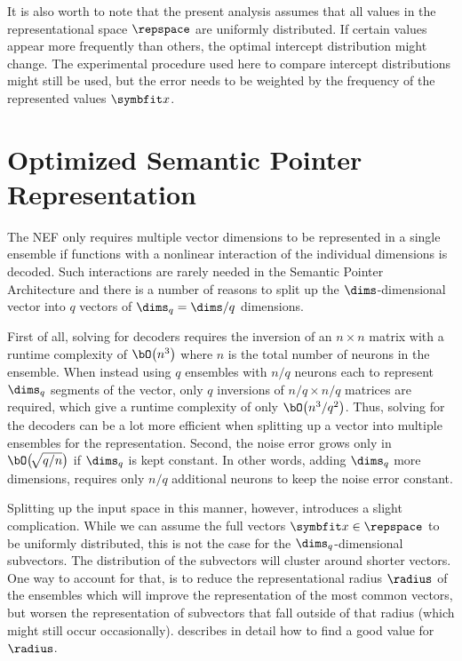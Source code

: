 It is also worth to note that the present analysis assumes that all values in the representational space $\repspace$ are uniformly distributed.
If certain values appear more frequently than others, the optimal intercept distribution might change.
The experimental procedure used here to compare intercept distributions might still be used, but the error needs to be weighted by the frequency of the represented values $\vc x$.


\section{Optimized Semantic Pointer Representation}
The NEF only requires multiple vector dimensions to be represented in a single ensemble if functions with a nonlinear interaction of the individual dimensions is decoded.
Such interactions are rarely needed in the Semantic Pointer Architecture and there is a number of reasons to split up the $\dims$-dimensional vector into $q$ vectors of $\dims_q = \dims / q$ dimensions.

First of all, solving for decoders requires the inversion of an $n \times n$ matrix with a runtime complexity of $\bO\bigl(n^3\bigr)$ where $n$ is the total number of neurons in the ensemble.
When instead using $q$ ensembles with $n/q$ neurons each to represent $\dims_q$ segments of the vector, only $q$ inversions of $n/q \times n/q$ matrices are required, which give a runtime complexity of only $\bO\bigl(n^3/q^2\bigr)$.
Thus, solving for the decoders can be a lot more efficient when splitting up a vector into multiple ensembles for the representation.
Second, the noise error grows only in $\bO\bigl(\!\sqrt{q/n}\bigr)$ if $\dims_q$ is kept constant.
In other words, adding $\dims_q$ more dimensions, requires only $n/q$ additional neurons to keep the noise error constant.

Splitting up the input space in this manner, however, introduces a slight complication.
While we can assume the full vectors $\vc x \in \repspace$ to be uniformly distributed, this is not the case for the $\dims_q$-dimensional subvectors.
The distribution of the subvectors will cluster around shorter vectors.
One way to account for that, is to reduce the representational radius $\radius$ of the ensembles which will improve the representation of the most common vectors, but worsen the representation of subvectors that fall outside of that radius (which might still occur occasionally).
\Textcite{gosmann216} describes in detail how to find a good value for $\radius$.

